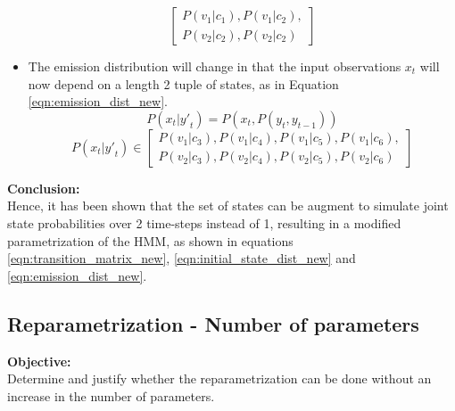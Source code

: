 \documentclass[parskip=half]{scrartcl}
\begin{document}
\begin{itemize}
\begin{equation}
\begin{bmatrix}
                    P(v_1|c_1), P(v_1|c_2), \\
                    P(v_2|c_2), P(v_2|c_2)
                \end{bmatrix}
            \end{equation}
            \item 
            The emission distribution will change in that the input observations $x_t$ will now depend on a length 2 tuple of states, as in Equation \ref{eqn:emission_dist_new}. 
            $$P(x_t | {y\prime}_t) = P(x_t, P(y_t, y_{t-1}))$$
            \begin{equation} \label{eqn:emission_dist_new}
                P(x_t | {y\prime}_t) 
                \in 
                \begin{bmatrix}
                    P(v_1|c_3), P(v_1|c_4), P(v_1|c_5), P(v_1|c_6), \\
                    P(v_2|c_3), P(v_2|c_4), P(v_2|c_5), P(v_2|c_6)
                \end{bmatrix}
            \end{equation}
        \end{itemize}

        \textbf{Conclusion:}\\
        Hence, it has been shown that the set of states can be augment to simulate joint state probabilities over 2 time-steps instead of 1, resulting in a modified parametrization of the HMM, as shown in equations \ref{eqn:transition_matrix_new}, \ref{eqn:initial_state_dist_new} and \ref{eqn:emission_dist_new}.
    


    \subsection{Reparametrization - Number of parameters} %
    \label{sub:reparametrization_number_of_parameters}

        \textbf{Objective:}\\
        Determine and justify whether the reparametrization can be done without an increase in the number of parameters.
\end{document}

